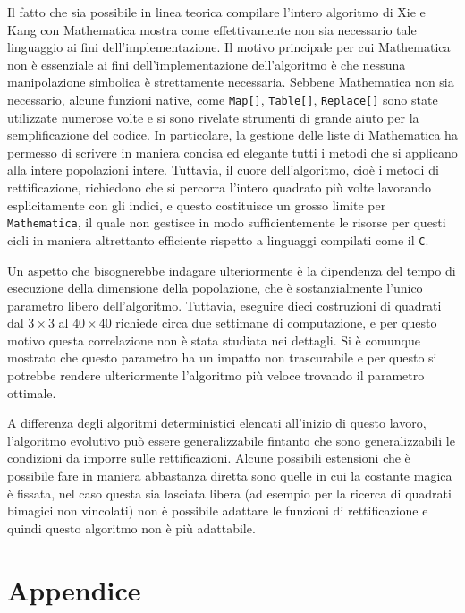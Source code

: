 \documentclass[italian,twoside,twocolumn]{article}
\begin{document}
Il fatto che sia possibile in linea teorica compilare l'intero algoritmo di Xie e Kang con Mathematica mostra come effettivamente non sia necessario tale linguaggio ai fini dell'implementazione. Il motivo principale per cui Mathematica non è essenziale ai fini dell'implementazione dell'algoritmo è che nessuna manipolazione simbolica è strettamente necessaria. Sebbene Mathematica non sia necessario, alcune funzioni native, come \texttt{Map[]}, \texttt{Table[]}, \texttt{Replace[]} sono state utilizzate numerose volte e si sono rivelate strumenti di grande aiuto per la semplificazione del codice. In particolare, la gestione delle liste di Mathematica ha permesso di scrivere in maniera concisa ed elegante tutti i metodi che si applicano alla intere popolazioni intere. Tuttavia, il cuore dell'algoritmo, cioè i metodi di rettificazione, richiedono che si percorra l'intero quadrato più volte lavorando esplicitamente con gli indici, e questo costituisce un grosso limite per \texttt{Mathematica}, il quale non gestisce in modo sufficientemente le risorse per questi cicli in maniera altrettanto efficiente rispetto a linguaggi compilati come il \texttt{C}.

Un aspetto che bisognerebbe indagare ulteriormente è la dipendenza del tempo di esecuzione della dimensione della popolazione, che è sostanzialmente l'unico parametro libero dell'algoritmo. Tuttavia, eseguire dieci costruzioni di quadrati dal $ 3\times 3 $ al $ 40\times40 $ richiede circa due settimane di computazione, e per questo motivo questa correlazione non è stata studiata nei dettagli. Si è comunque mostrato che questo parametro ha un impatto non trascurabile e per questo si potrebbe rendere ulteriormente l'algoritmo più veloce trovando il parametro ottimale.

A differenza degli algoritmi deterministici elencati all'inizio di questo lavoro, l'algoritmo evolutivo può essere generalizzabile fintanto che sono generalizzabili le condizioni da imporre sulle rettificazioni. Alcune possibili estensioni che è possibile fare in maniera abbastanza diretta sono quelle in cui la costante magica è fissata, nel caso questa sia lasciata libera (ad esempio per la ricerca di quadrati bimagici non vincolati) non è possibile adattare le funzioni di rettificazione e quindi questo algoritmo non è più adattabile. 

\section{Appendice}
\end{document}
